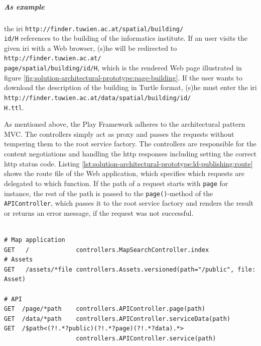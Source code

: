 \documentclass[draft,final]{vutinfth} %
\begin{document}
\subparagraph{As example} the \gls{iri} \texttt{http://finder.tuwien.ac.at/spatial/building/\\id/H} references to the building of the informatics institute. If an user visits the given \gls{iri} with a Web browser, (s)he will be redirected to \texttt{http://finder.tuwien.ac.at/\\page/spatial/building/id/H}, which is the rendered Web page illustrated in figure \ref{fig:solution-architectural-prototype:page-building}. If the user wants to download the description of the building in Turtle format, (s)he must enter the \gls{iri} \texttt{http://finder.tuwien.ac.at/data/spatial/building/id/\\H.ttl}.

As mentioned above, the Play Framework adheres to the architectural pattern MVC. The controllers simply act as proxy and passes the requests without tempering them to the root service factory. The controllers are responsible for the content negotiations and handling the \gls{http} responses including setting the correct \gls{http} status code. Listing \ref{lst:solution-architectural-prototype:ld-publishing:route} shows the route file of the Web application, which specifies which requests are delegated to which function. If the path of a request starts with \texttt{page} for instance, the rest of the path is passed to the \texttt{page()}-method of the \texttt{APIController}, which  passes it to the root service factory and renders the result or returns an error message, if the request was not successful.

\begin{lstlisting}[frame=single, basicstyle=\tiny, caption=Route file of Play Web application, label={lst:solution-architectural-prototype:ld-publishing:route}]

# Map application
GET   /             controllers.MapSearchController.index
# Assets
GET   /assets/*file controllers.Assets.versioned(path="/public", file: Asset)

# API
GET  /page/*path    controllers.APIController.page(path)
GET  /data/*path    controllers.APIController.serviceData(path)
GET  /$path<(?!.*?public)(?!.*?page)(?!.*?data).*>
                    controllers.APIController.service(path)
\end{lstlisting}
\end{document}
